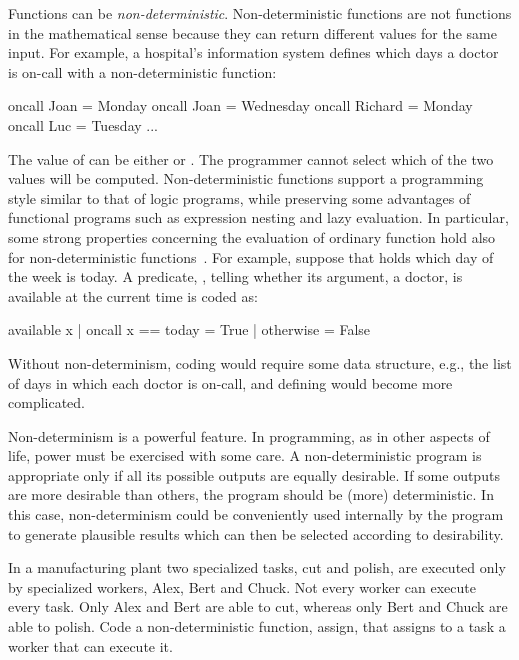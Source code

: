 Functions can be \emph{non-deterministic}.
Non-deterministic functions are not functions in the mathematical sense
because they can return different values for the same input.
For example, a hospital's information system defines which
days a doctor is on-call with a non-deterministic function:
%
\begin{prog}
oncall Joan    = Monday
oncall Joan    = Wednesday
oncall Richard = Monday
oncall Luc     = Tuesday
...
\end{prog}
%
The value of  can be either
 or .
The programmer cannot select which of the two values will be computed.
Non-deterministic functions support a programming style similar
to that of logic programs, while preserving some advantages of functional
programs such as expression nesting and lazy evaluation.
In particular, some strong properties concerning the evaluation
of ordinary function
hold also for non-deterministic functions~\cite{Antoy97ALP}.
For example, suppose that  holds which day of
the week is today.
A predicate, , telling whether
its argument, a doctor, is available at the current time is coded as:
%
\begin{prog}
available x | oncall x == today = True
            | otherwise         = False
\end{prog}
%
Without non-determinism, coding 
would require some data structure, e.g., 
the list of days in which each doctor is on-call,
and defining  would become more complicated.

Non-determinism is a powerful feature.
In programming,
as in other aspects of life, power must be exercised with some care.
A non-deterministic program is appropriate 
only if all its possible outputs are equally desirable.
If some outputs are more desirable than others,
the program should be (more) deterministic.
In this case,
non-determinism could be conveniently used internally by the program
to generate plausible results
which can then be selected according to desirability.

\begin{exercise}
\label{ex_nondettask}
In a manufacturing plant two specialized tasks,
{\codefont cut} and {\codefont polish},
are executed only by specialized workers,
{\codefont Alex}, {\codefont Bert} and {\codefont Chuck}.
Not every worker can execute every task.
Only {\codefont Alex} and {\codefont Bert} are able to
{\codefont cut}, whereas only {\codefont Bert} and {\codefont Chuck}
are able to {\codefont polish}.
Code a non-deterministic function, {\codefont assign},
that assigns to a task a worker that can execute it.
\end{exercise}

